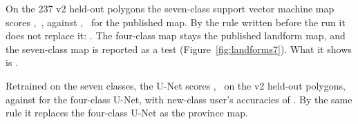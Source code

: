 On the 237 v2 held-out polygons the seven-class support vector machine map scores ,
\kap\,, against , \kap\, for the published
map. By the rule written before the run it does not replace it: . The four-class map stays the published landform map, and the seven-class map is reported as a test
(Figure~\ref{fig:landforms7}). What it shows is .

Retrained on the seven classes, the U-Net scores , \kap\, on the
v2 held-out polygons, against  for the four-class U-Net, with new-class user's accuracies of
. %
By the same rule it replaces the four-class U-Net as the province map.


